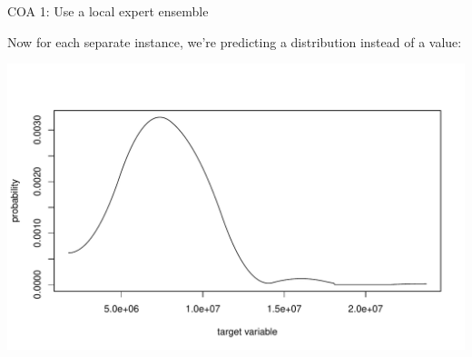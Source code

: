 \documentclass[ignorenonframetext,]{beamer}
\begin{document}
\begin{frame}[fragile]{COA 1: Use a local expert ensemble}

Now for each separate instance, we're predicting a distribution instead
of a value:

\footnotesize
\includegraphics{presentation_files/figure-beamer/unnamed-chunk-15-1.pdf}


\end{frame}
\end{document}
